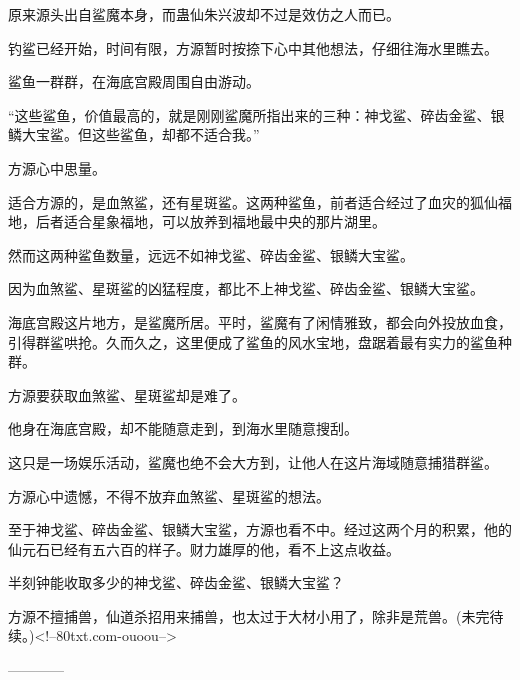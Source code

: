 \begin{this_body}
原来源头出自鲨魔本身，而蛊仙朱兴波却不过是效仿之人而已。

钓鲨已经开始，时间有限，方源暂时按捺下心中其他想法，仔细往海水里瞧去。

鲨鱼一群群，在海底宫殿周围自由游动。

“这些鲨鱼，价值最高的，就是刚刚鲨魔所指出来的三种：神戈鲨、碎齿金鲨、银鳞大宝鲨。但这些鲨鱼，却都不适合我。”

方源心中思量。

适合方源的，是血煞鲨，还有星斑鲨。这两种鲨鱼，前者适合经过了血灾的狐仙福地，后者适合星象福地，可以放养到福地最中央的那片湖里。

然而这两种鲨鱼数量，远远不如神戈鲨、碎齿金鲨、银鳞大宝鲨。

因为血煞鲨、星斑鲨的凶猛程度，都比不上神戈鲨、碎齿金鲨、银鳞大宝鲨。

海底宫殿这片地方，是鲨魔所居。平时，鲨魔有了闲情雅致，都会向外投放血食，引得群鲨哄抢。久而久之，这里便成了鲨鱼的风水宝地，盘踞着最有实力的鲨鱼种群。

方源要获取血煞鲨、星斑鲨却是难了。

他身在海底宫殿，却不能随意走到，到海水里随意搜刮。

这只是一场娱乐活动，鲨魔也绝不会大方到，让他人在这片海域随意捕猎群鲨。

方源心中遗憾，不得不放弃血煞鲨、星斑鲨的想法。

至于神戈鲨、碎齿金鲨、银鳞大宝鲨，方源也看不中。经过这两个月的积累，他的仙元石已经有五六百的样子。财力雄厚的他，看不上这点收益。

半刻钟能收取多少的神戈鲨、碎齿金鲨、银鳞大宝鲨？

方源不擅捕兽，仙道杀招用来捕兽，也太过于大材小用了，除非是荒兽。(未完待续。)<!--80txt.com-ouoou-->

------------

\end{this_body}

